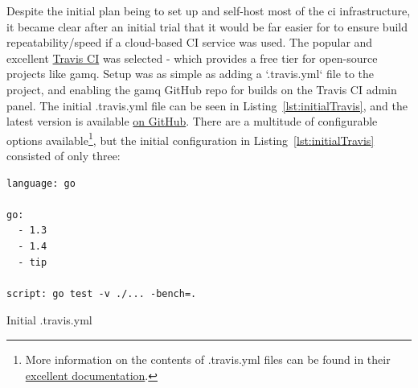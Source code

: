 Despite the initial plan being to set up and self-host most of the \gls{ci}
infrastructure, it became clear after an initial trial that it would be far
easier for to ensure build repeatability/speed if a cloud-based CI service was
used. The popular and excellent \href{https://travis-ci.org/}{Travis CI} was
selected - which provides a free tier for open-source projects like gamq. Setup
was as simple as adding a `.travis.yml` file to the project, and enabling the
gamq GitHub repo for builds on the Travis CI admin panel. The initial
.travis.yml file can be seen in Listing~\ref{lst:initialTravis}, and the latest
version is available
\href{https://github.com/FireEater64/gamq/blob/master/.travis.yml}{on GitHub}.
There are a multitude of configurable options available\footnote{More
information on the contents of .travis.yml files can be found in their
\href{https://docs.travis-ci.com/}{excellent documentation}.}, but the initial
configuration in Listing~\ref{lst:initialTravis} consisted of only three:

\begin{listing}
  \centering
  \begin{verbatim}
language: go

go:
  - 1.3
  - 1.4
  - tip

script: go test -v ./... -bench=.
  \end{verbatim}
  \caption{Initial .travis.yml}
  \label{lst:initialTravis}
\end{listing}

